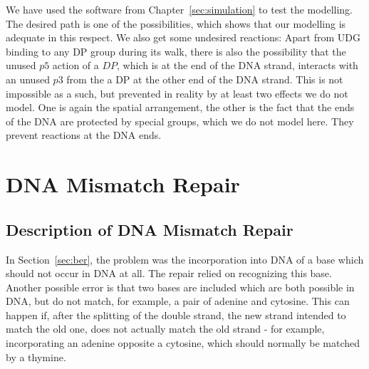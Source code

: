 \documentclass[review]{elsarticle}
\begin{document}
We have used the software from Chapter~\ref{sec:simulation} to test the modelling. The desired path is one of the possibilities, which shows that our modelling is adequate in this respect. We also get some undesired reactions: Apart from UDG binding to any DP group during its walk, there is also the possibility that the unused $p5$ action of a $DP$, which is at the end of the DNA strand, interacts with an unused $p3$ from the a DP at the other end of the DNA strand. This is not impossible as a such, but prevented in reality by at least two effects we do not model. One is again the spatial arrangement, the other is the fact that the ends of the DNA are protected by special groups, which we do not model here. They prevent reactions at the DNA ends.

\section{DNA Mismatch Repair}
\label{sec:dnamimatch}

\subsection{Description of DNA Mismatch Repair}

In Section~\ref{sec:ber}, the problem was the incorporation into DNA of a base which should not occur in DNA at all. The repair relied on recognizing this base. Another possible error is that two bases are included which are both possible in DNA, but do not match, for example, a pair of adenine and cytosine. This can happen if, after the splitting of the double strand, the new strand intended to match the old one, does not actually match the old strand - for example, incorporating an adenine opposite a cytosine, which should normally be matched by a thymine.
\end{document}
